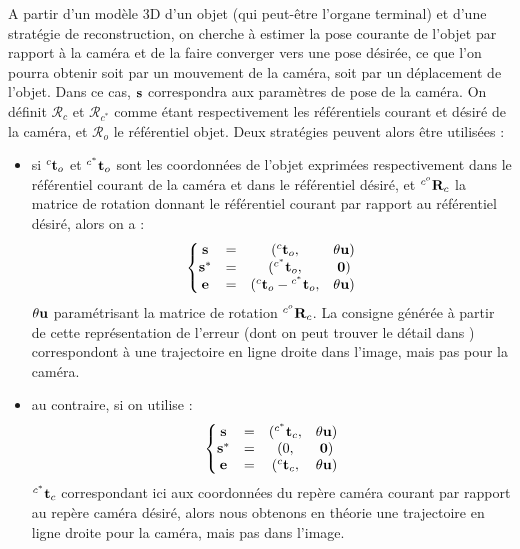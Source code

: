 A partir d'un mod\`ele 3D d'un objet (qui peut-\^etre l'organe terminal) et 
d'une strat\'egie de reconstruction, on cherche \`a estimer la pose courante de 
l'objet par rapport \`a la cam\'era et de la faire converger vers une pose 
d\'esir\'ee, ce que l'on pourra obtenir soit par un mouvement de la cam\'era, 
soit par un d\'eplacement de l'objet. Dans ce cas, ${\bf s}$ correspondra aux 
param\`etres de pose de la cam\'era. On d\'efinit $\mathcal R_c$ et $\mathcal 
R_{c^*}$ comme \'etant respectivement les r\'ef\'erentiels courant et d\'esir\'e 
de la cam\'era, et $\mathcal R_o$ le r\'ef\'erentiel objet. Deux strat\'egies 
peuvent alors \^etre utilis\'ees :
\begin{itemize}
 \item si ${}^c{\bf t}_o$ et ${}^{c^*}{\bf t}_o$ sont les coordonn\'ees de 
l'objet exprim\'ees respectivement dans le r\'ef\'erentiel courant de la 
cam\'era et dans le r\'ef\'erentiel d\'esir\'e, et ${}^{c^o}{\bf R}_c$ la 
matrice de rotation donnant le r\'ef\'erentiel courant par rapport au 
r\'ef\'erentiel d\'esir\'e, alors on a :
 \begin{equation}
 \left \lbrace
 \begin{matrix}
  {\bf s} &=& ({}^c{\bf t}_o,& \theta {\bf u}) \\
  {\bf s}^* &=& ({}^{c^*}{\bf t}_o,& {\bf 0}) \\
  {\bf e} &=& ({}^c{\bf t}_o - {}^{c^*}{\bf t}_o,& \theta {\bf u})
 \end{matrix}
  \right .
\label{chap01:eq11}
\end{equation}
$\theta {\bf u}$ param\'etrisant la matrice de rotation ${}^{c^o}{\bf R}_c$. La 
consigne g\'en\'er\'ee \`a partir de cette repr\'esentation de l'erreur (dont on 
peut trouver le d\'etail dans \cite{chaumette:tuto01}) correspondont \`a une 
trajectoire en ligne droite dans l'image, mais pas pour la cam\'era.
\item au contraire, si on utilise :
\begin{equation}
 \left \lbrace
 \begin{matrix}
  {\bf s} &=& ({}^{c^*}{\bf t}_c,& \theta {\bf u}) \\
  {\bf s}^* &=& (0,& {\bf 0}) \\
  {\bf e} &=& ({}^c{\bf t}_c,& \theta {\bf u})
 \end{matrix}
  \right .
\label{chap01:eq12}
\end{equation}
${}^{c^*}{\bf t}_c$ correspondant ici aux coordonn\'ees du rep\`ere cam\'era 
courant par rapport au rep\`ere cam\'era d\'esir\'e, alors nous obtenons en 
th\'eorie une trajectoire en ligne droite pour la cam\'era, mais pas dans 
l'image. 
\end{itemize}

